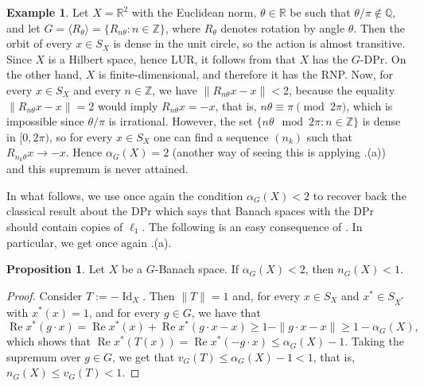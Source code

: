 \documentclass[a4paper,12pt]{amsart}
\theoremstyle{definition}
\newtheorem{proposition}[theorem]{Proposition}
\theoremstyle{definition}
\newtheorem{example}[theorem]{Example}
\theoremstyle{remark}
\numberwithin{equation}{section}
\newcommand{\R}{\mathbb{R}}
\newcommand{\Z}{\mathbb{Z}}
\newcommand{\Q}{\mathbb{Q}}
\DeclareMathOperator{\re}{Re}
\DeclareMathOperator{\id}{Id}
\renewcommand{\geq}{\geqslant}
\renewcommand{\leq}{\leqslant}
\newcommand{\<}{\langle}
\renewcommand{\>}{\rangle}
\begin{document}
	\begin{example} \label{MG(X)-example} Let $X=\mathbb{R}^2$ with the Euclidean norm, $\theta\in\R$ be such that $\theta/\pi \notin \Q$, and let $G=\langle R_\theta\rangle=\{R_{n\theta}:n\in\Z\}$, where $R_\theta$ denotes rotation by angle $\theta$. Then the orbit of every $x \in S_X$ is dense in the unit circle, so the action is almost transitive. Since $X$ is a Hilbert space, hence LUR, it follows from  that $X$ has the $G$-DPr. On the other hand, $X$ is finite-dimensional, and therefore it has the RNP. Now, for every $x \in S_X$ and every $n \in \mathbb{Z}$, we have $\|R_{n\theta}x-x\|<2$, because the equality $\|R_{n\theta}x-x\|=2$ would imply $R_{n\theta}x=-x$, that is, $n\theta \equiv \pi \pmod{2\pi}$, which is impossible since $\theta/\pi$ is irrational. However, the set $\{n\theta \mod 2\pi : n \in \mathbb{Z}\}$ is dense in $[0,2\pi)$, so for every $x \in S_X$ one can find a sequence $(n_k)$ such that $R_{n_k\theta}x \to -x$. Hence $\alpha_G(X) = 2$ (another way of seeing this is applying .(a)) and this supremum is never attained.
	\end{example}
	
	In what follows, we use once again the condition $\alpha_G(X) < 2$ to recover back the classical result about the DPr which says that Banach spaces with the DPr should contain copies of $\ell_1$. The following is an easy consequence of . In particular, we get once again .(a).
	
	\begin{proposition} \label{relation-between-alpha-and-numerical-index} Let $X$ be a $G$-Banach space. If $\alpha_G(X) < 2$, then $n_G(X) < 1$. 
	\end{proposition}
	
	\begin{proof} Consider $T:= -\id_X$. Then $\|T\| = 1$ and, for every $x \in S_X$ and $x^* \in S_{X^*}$ with $x^*(x) = 1$, and for every $g \in G$, we have that 
		\begin{equation*}
			\re x^*(g \cdot x) = \re x^*(x) + \re x^*(g \cdot x - x) \geq 1 - \|g \cdot x - x\| \geq  1 - \alpha_G(X),
		\end{equation*}
		which shows that $\re x^*(T(x)) = \re x^*(-g \cdot x) \leq \alpha_G(X) - 1$. Taking the supremum over $g \in G$, we get that $v_G(T) \leq \alpha_G(X) - 1 < 1$, that is, $n_G(X) \leq v_G(T) < 1$. 
	\end{proof}
	
\end{document}
